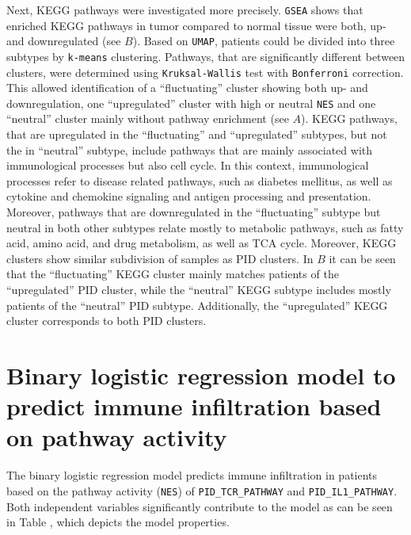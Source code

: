 \documentclass[
  parskip,
  openany]{scrreprt}
\begin{document}
Next, KEGG pathways were investigated more precisely. \texttt{GSEA}
shows that enriched KEGG pathways in tumor compared to normal tissue
were both, up- and downregulated (see  \(B\)). Based on
\texttt{UMAP}, patients could be divided into three subtypes by
\texttt{k-means} clustering. Pathways, that are significantly different
between clusters, were determined using \texttt{Kruksal-Wallis} test
with \texttt{Bonferroni} correction. This allowed identification of a
``fluctuating'' cluster showing both up- and downregulation, one
``upregulated'' cluster with high or neutral \texttt{NES} and one
``neutral'' cluster mainly without pathway enrichment (see 
\(A\)). KEGG pathways, that are upregulated in the ``fluctuating'' and
``upregulated'' subtypes, but not the in ``neutral'' subtype, include
pathways that are mainly associated with immunological processes but
also cell cycle. In this context, immunological processes refer to
disease related pathways, such as diabetes mellitus, as well as cytokine
and chemokine signaling and antigen processing and presentation.\\
Moreover, pathways that are downregulated in the ``fluctuating'' subtype
but neutral in both other subtypes relate mostly to metabolic pathways,
such as fatty acid, amino acid, and drug metabolism, as well as TCA
cycle. Moreover, KEGG clusters show similar subdivision of samples as
PID clusters. In  \(B\) it can be seen that the
``fluctuating'' KEGG cluster mainly matches patients of the
``upregulated'' PID cluster, while the ``neutral'' KEGG subtype includes
mostly patients of the ``neutral'' PID subtype. Additionally, the
``upregulated'' KEGG cluster corresponds to both PID clusters.

\hypertarget{binary-logistic-regression-model-to-predict-immune-infiltration-based-on-pathway-activity}{%
\section{Binary logistic regression model to predict immune infiltration
based on pathway
activity}\label{binary-logistic-regression-model-to-predict-immune-infiltration-based-on-pathway-activity}}

The binary logistic regression model predicts immune infiltration in
patients based on the pathway activity (\texttt{NES}) of
\texttt{PID\_TCR\_PATHWAY} and \texttt{PID\_IL1\_PATHWAY}. Both
independent variables significantly contribute to the model as can be
seen in Table , which depicts the model properties.
\end{document}
